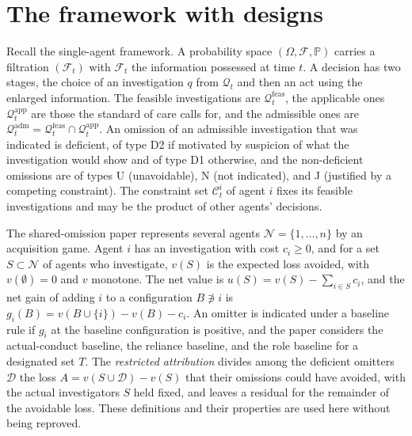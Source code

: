 \documentclass[11pt]{article}
\newcommand{\F}{\mathcal F}
\newcommand{\Q}{\mathcal Q}
\newcommand{\C}{\mathcal C}
\newcommand{\N}{\mathcal N}
\newcommand{\PP}{\mathbb P}
\newcommand{\feas}{\mathrm{feas}}
\newcommand{\adm}{\mathrm{adm}}
\newcommand{\app}{\mathrm{app}}
\newcommand{\Dfc}{\mathcal D}
\theoremstyle{plain}
\theoremstyle{definition}
\begin{document}
\section{The framework with designs}\label{sec:framework}

Recall the single-agent framework. A probability space $(\Omega,\F,\PP)$ carries a filtration $(\F_t)$ with $\F_t$ the information possessed at time $t$. A decision has two stages, the choice of an investigation $q$ from $\Q_t$ and then an act using the enlarged information. The feasible investigations are $\Q^{\feas}_t$, the applicable ones $\Q^{\app}_t$ are those the standard of care calls for, and the admissible ones are $\Q^{\adm}_t=\Q^{\feas}_t\cap\Q^{\app}_t$. An omission of an admissible investigation that was indicated is deficient, of type D2 if motivated by suspicion of what the investigation would show and of type D1 otherwise, and the non-deficient omissions are of types U (unavoidable), N (not indicated), and J (justified by a competing constraint). The constraint set $\C^i_t$ of agent $i$ fixes its feasible investigations and may be the product of other agents' decisions.

The shared-omission paper \cite{flyxion2026shared} represents several agents $\N=\{1,\dots,n\}$ by an acquisition game. Agent $i$ has an investigation with cost $c_i\ge0$, and for a set $S\subset\N$ of agents who investigate, $v(S)$ is the expected loss avoided, with $v(\emptyset)=0$ and $v$ monotone. The net value is $u(S)=v(S)-\sum_{i\in S}c_i$, and the net gain of adding $i$ to a configuration $B\not\ni i$ is $g_i(B)=v(B\cup\{i\})-v(B)-c_i$. An omitter is indicated under a baseline rule if $g_i$ at the baseline configuration is positive, and the paper considers the actual-conduct baseline, the reliance baseline, and the role baseline for a designated set $T$. The \emph{restricted attribution} divides among the deficient omitters $\Dfc$ the loss $A=v(S\cup\Dfc)-v(S)$ that their omissions could have avoided, with the actual investigators $S$ held fixed, and leaves a residual for the remainder of the avoidable loss. These definitions and their properties are used here without being reproved.
\end{document}
